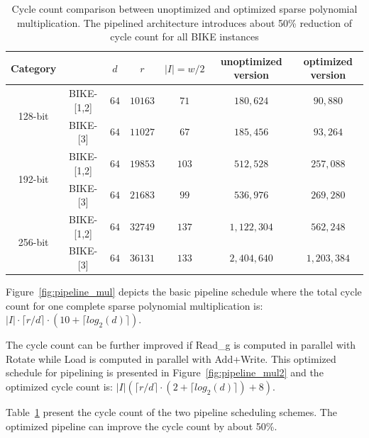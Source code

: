 \documentclass[runningheads]{llncs}
\begin{document}
\begin{table}[!tb]\centering
\caption{Cycle count comparison between unoptimized and optimized sparse polynomial multiplication. The pipelined architecture introduces about 50\% reduction of cycle count for all BIKE instances}
\begin{tabular}{cc|ccccc}
  \hline
 \textbf{Category}        &             & $d$ & $r$  & $|I|=w/2$  & unoptimized version& optimized version\\\hline
\multirow{ 2}{*}{128-bit} &  BIKE-[1,2] & $64$ & $10163$  & $71$  & $180,624$ & $90,880$\\
                          &  BIKE-[3] & $64$ & $11027$  & $67$  & $185,456$& $93,264$\\
  \hline
\multirow{ 2}{*}{192-bit} &  BIKE-[1,2] & $64$ & $19853$  & $103$  &$512,528$& $257,088$\\
                          &  BIKE-[3] & $64$ & $21683$  & $99$  &$536,976$& $269,280$\\
  \hline
\multirow{ 2}{*}{256-bit} &  BIKE-[1,2] & $64$ & $32749$  & $137$  &$1,122,304$& $562,248$\\
                          &  BIKE-[3] & $64$ & $36131$  & $133$  &$2,404,640$& $1,203,384$\\
  \hline
\end{tabular}
\label{tab::sparse}
\vspace{-4mm}
\end{table}

Figure~\ref{fig:pipeline_mul} depicts the basic pipeline schedule where the total cycle count for one complete sparse polynomial multiplication is:
$|I|\cdot\lceil r/d\rceil\cdot (10+\lceil log_2(d)\rceil)$.

The cycle count can be further improved if Read\_g is computed in parallel
with Rotate while Load is computed in parallel with Add+Write.
This optimized schedule for pipelining is presented in Figure~\ref{fig:pipeline_mul2}
and the optimized cycle count is:
$
|I|(\lceil r/d\rceil\cdot (2+\lceil log_2(d)\rceil) + 8)
$.

Table~\ref{tab::sparse} present the cycle count
of the two pipeline scheduling schemes. The optimized pipeline can improve the cycle count by about 50\%.
\end{document}
